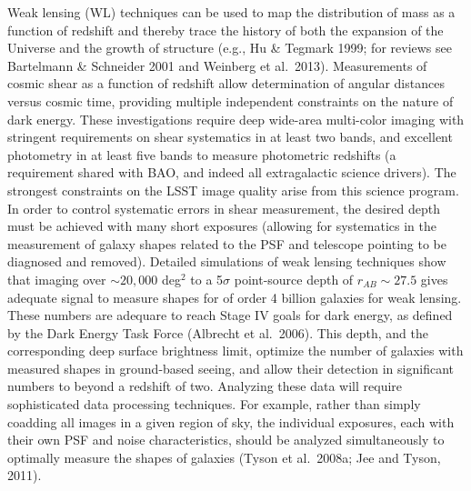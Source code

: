 \documentclass{emulateapj}
\newcommand{\B}[1]{{#1}}
\begin{document}
Weak lensing (WL) techniques can be used to map the distribution of
mass as a function of redshift and thereby trace the history of both
the expansion of the Universe and the growth of structure (e.g., Hu \&
Tegmark 1999; for reviews see Bartelmann \& Schneider 2001 and
Weinberg et al.~2013).  Measurements of cosmic shear as a function of
redshift allow determination of angular distances versus cosmic time,
providing multiple independent constraints on the nature of dark
energy.  These investigations require deep wide-area multi-color
imaging with stringent requirements on shear systematics in at least
two bands, and excellent photometry in at least five bands to measure
photometric redshifts (a requirement shared with BAO, and indeed all
extragalactic science drivers). The strongest constraints on the LSST
image quality arise from this science program. In order to control
systematic errors in shear measurement, the desired depth must be
achieved with many short exposures (allowing for systematics in the
measurement of galaxy shapes related
to the PSF and telescope pointing to be diagnosed and removed). Detailed simulations of
weak lensing techniques show that imaging over $\sim20,000$ deg$^2$ to
a 5$\sigma$ point-source depth of $r_{AB} \sim 27.5$ gives adequate
signal to measure shapes for of order 4 billion galaxies for weak
lensing.  These numbers are adequare to reach
Stage IV goals for dark energy, as defined by the Dark Energy Task
Force (Albrecht et al.~2006).   
This
depth, \B{and the corresponding deep surface brightness limit,}
optimize the number of galaxies with measured shapes in ground-based
seeing, and allow their detection in significant numbers to beyond a
redshift of two.  Analyzing these data will
require sophisticated data processing techniques.  For example, rather
than simply coadding all images in a given region of sky, the
individual exposures, each with their own PSF and noise
characteristics,  should be analyzed simultaneously to optimally
measure the shapes of galaxies (Tyson et al.~2008a;
Jee and Tyson, 2011).
\end{document}
